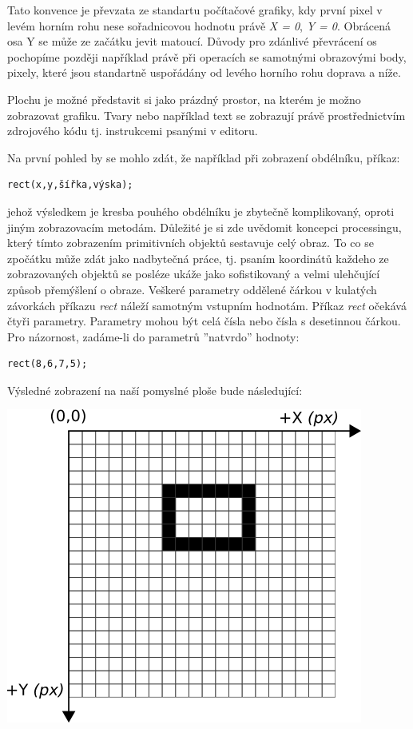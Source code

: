 \documentclass[11pt]{article}
\begin{document}
Tato konvence je převzata ze standartu počítačové grafiky, kdy první pixel v levém horním rohu nese sořadnicovou hodnotu právě {\em X = 0}, {\em Y = 0}. Obrácená osa Y se může ze začátku jevit matoucí. Důvody pro zdánlivé převrácení os pochopíme později například právě při operacích se samotnými obrazovými body, pixely, které jsou standartně uspořádány od levého horního rohu doprava a níže.

Plochu je možné představit si jako prázdný prostor, na kterém je možno zobrazovat grafiku. Tvary nebo například text se zobrazují právě prostřednictvím zdrojového kódu tj. instrukcemi psanými v editoru.

Na první pohled by se mohlo zdát, že například při zobrazení obdélníku, příkaz:

\begin{lstlisting}
rect(x,y,šířka,výska);
\end{lstlisting}

jehož výsledkem je kresba pouhého obdélníku je zbytečně komplikovaný, oproti jiným zobrazovacím metodám. Důležité je si zde uvědomit koncepci processingu, který tímto zobrazením primitivních objektů sestavuje celý obraz. To co se zpočátku může zdát jako nadbytečná práce, tj. psaním koordinátů každeho ze zobrazovaných objektů se posléze ukáže jako sofistikovaný a velmi ulehčující způsob přemýšlení o obraze. Veškeré parametry oddělené čárkou v kulatých závorkách příkazu {\em rect} náleží samotným vstupním hodnotám. Příkaz {\em rect} očekává čtyři parametry. Parametry mohou být celá čísla nebo čísla s desetinnou čárkou. Pro názornost, zadáme-li do parametrů ''natvrdo'' hodnoty:

\begin{lstlisting}
rect(8,6,7,5);
\end{lstlisting}

Výsledné zobrazení na naší pomyslné ploše bude následující:

\begin{center}
\includegraphics[scale = 1]{imgs/gridRect2d.png}
\end{center}
\end{document}
